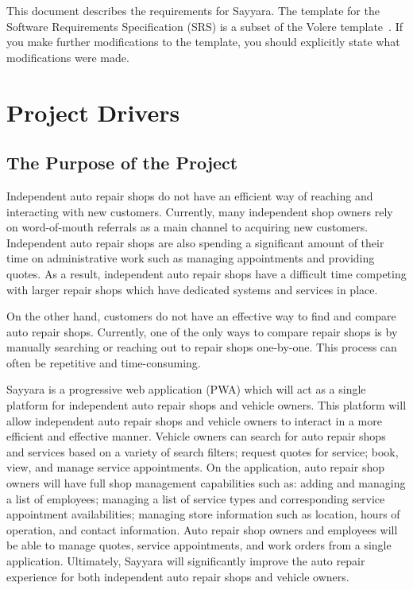 \documentclass[12pt]{article}
\begin{document}
\newpage


This document describes the requirements for Sayyara. The template for the Software Requirements
Specification (SRS) is a subset of the Volere template~\citep{RobertsonAndRobertson2012}. If you
make further modifications to the template, you should explicitly state what modifications were
made.

\section{Project Drivers}

\subsection{The Purpose of the Project}

Independent auto repair shops do not have an efficient way of reaching and interacting with new
customers. Currently, many independent shop owners rely on word-of-mouth referrals as a main
channel to acquiring new customers. Independent auto repair shops are also spending a significant
amount of their time on administrative work such as managing appointments and providing quotes. As
a result, independent auto repair shops have a difficult time competing with larger repair shops
which have dedicated systems and services in place.

On the other hand, customers do not have an effective way to find and compare auto repair shops.
Currently, one of the only ways to compare repair shops is by manually searching or reaching out to
repair shops one-by-one. This process can often be repetitive and time-consuming.

Sayyara is a progressive web application (PWA) which will act as a single platform for independent
auto repair shops and vehicle owners. This platform will allow independent auto repair shops and
vehicle owners to interact in a more efficient and effective manner. Vehicle owners can search for
auto repair shops and services based on a variety of search filters; request quotes for service;
book, view, and manage service appointments. On the application, auto repair shop owners will have
full shop management capabilities such as: adding and managing a list of employees; managing a list
of service types and corresponding service appointment availabilities; managing store information
such as location, hours of operation, and contact information. Auto repair shop owners and
employees will be able to manage quotes, service appointments, and work orders from a single
application. Ultimately, Sayyara will significantly improve the auto repair experience for both
independent auto repair shops and vehicle owners.
\end{document}
